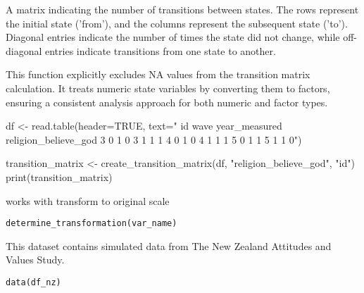 \documentclass[a4paper]{book}
\begin{document}
%
\begin{Value}
A matrix indicating the number of transitions between states. The rows represent the initial state ('from'), and the columns represent the subsequent state ('to'). Diagonal entries indicate the number of times the state did not change, while off-diagonal entries indicate transitions from one state to another.
\end{Value}
%
\begin{Note}
This function explicitly excludes NA values from the transition matrix calculation. It treats numeric state variables by converting them to factors, ensuring a consistent analysis approach for both numeric and factor types.
\end{Note}
%
\begin{Examples}
\begin{ExampleCode}
df <- read.table(header=TRUE, text="
id wave year_measured religion_believe_god
3 0 1 0
3 1 1 1
4 0 1 0
4 1 1 1
5 0 1 1
5 1 1 0")

transition_matrix <- create_transition_matrix(df, "religion_believe_god", "id")
print(transition_matrix)

\end{ExampleCode}
\end{Examples}
%
\begin{Description}
works with transform to original scale
\end{Description}
%
\begin{Usage}
\begin{verbatim}
determine_transformation(var_name)
\end{verbatim}
\end{Usage}
%
\begin{Description}
This dataset contains simulated data from The New Zealand Attitudes and Values Study.
\end{Description}
%
\begin{Usage}
\begin{verbatim}
data(df_nz)
\end{verbatim}
\end{Usage}
%
\end{document}
